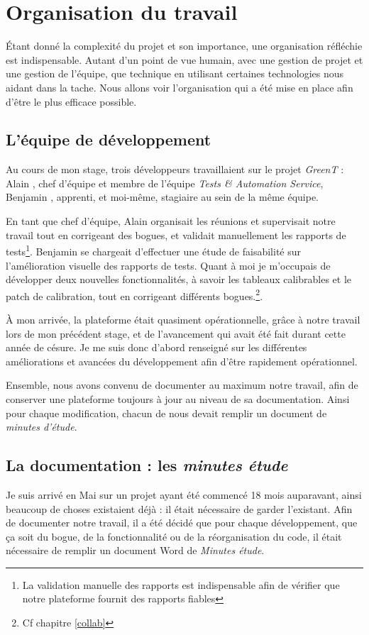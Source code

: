 \chapter{Organisation du travail}\label{chapOrganization}
\putminitoc \'Etant donné la complexité du projet et son importance, une organisation réfléchie est indispensable. Autant d'un point de vue humain, avec une gestion de projet et une gestion de l'équipe, que technique en utilisant certaines technologies nous aidant dans la tache.  Nous allons voir l'organisation qui a été mise en place afin d'être le plus efficace possible.

\section{L'équipe de développement}
Au cours de mon stage, trois développeurs travaillaient sur le projet \textit{GreenT} : Alain , chef d’équipe et membre de
l’équipe \textit{Tests \& Automation Service}, Benjamin , apprenti, et moi-même, stagiaire au sein de la même équipe.

En tant que chef d’équipe, Alain  organisait les réunions et supervisait notre travail tout en corrigeant des bogues, et validait manuellement les rapports de tests\footnote{La validation manuelle des rapports est indispensable afin de vérifier que notre plateforme fournit des rapports fiables}. Benjamin  se chargeait d'effectuer une étude de faisabilité sur l'amélioration visuelle des rapports de tests. Quant à moi je m'occupais de développer deux nouvelles fonctionnalités, à savoir les tableaux calibrables et le patch de calibration, tout en corrigeant différents bogues.\footnote{Cf chapitre \ref{collab}}.


À mon arrivée, la plateforme était quasiment opérationnelle, grâce à notre travail lors de mon précédent stage, et de l'avancement qui avait été fait durant cette année de césure. Je me suis donc d'abord renseigné sur les différentes améliorations et avancées du développement afin d'être rapidement opérationnel.  

Ensemble, nous avons convenu de documenter au maximum notre travail, afin de conserver une plateforme toujours à jour au niveau de sa documentation. Ainsi pour chaque modification, chacun de nous devait remplir un document de \textit{minutes d'étude}.

\section{La documentation : les \textit{minutes étude}}
Je suis arrivé en Mai sur un projet ayant été commencé 18 mois auparavant, ainsi beaucoup de choses existaient déjà : il était nécessaire de
garder l'existant. Afin de documenter notre travail, il a été décidé que pour chaque développement, que ça soit du bogue, de la fonctionnalité ou de la réorganisation du code, il était nécessaire de remplir un document Word de \textit{Minutes étude}. 

